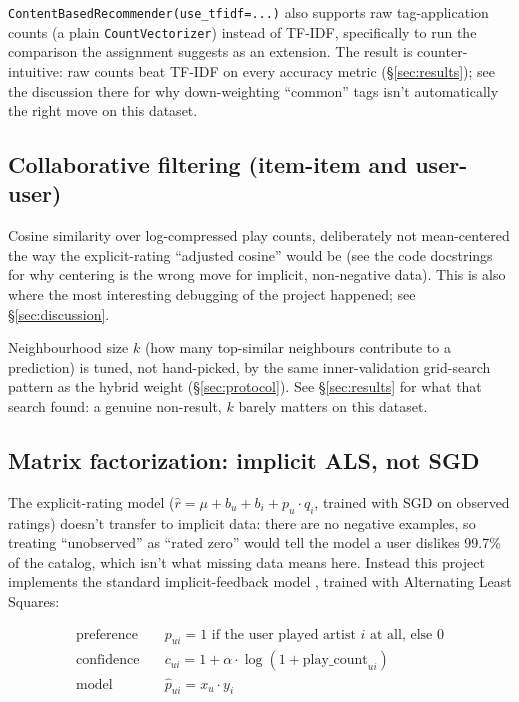 \documentclass[11pt,a4paper]{article}
\newcommand{\code}[1]{\texttt{#1}}
\newcommand{\secref}[1]{\S\ref{#1}}
\begin{document}
\code{ContentBasedRecommender(use\_tfidf=...)} also supports raw tag-application counts (a plain \code{CountVectorizer}) instead of TF-IDF, specifically to run the comparison the assignment suggests as an extension. The result is counter-intuitive: raw counts beat TF-IDF on every accuracy metric (\secref{sec:results}); see the discussion there for why down-weighting ``common'' tags isn't automatically the right move on this dataset.

\subsection{Collaborative filtering (item-item and user-user)}

Cosine similarity over log-compressed play counts, deliberately not mean-centered the way the explicit-rating ``adjusted cosine'' would be (see the code docstrings for why centering is the wrong move for implicit, non-negative data). This is also where the most interesting debugging of the project happened; see \secref{sec:discussion}.

Neighbourhood size $k$ (how many top-similar neighbours contribute to a prediction) is tuned, not hand-picked, by the same inner-validation grid-search pattern as the hybrid weight (\secref{sec:protocol}). See \secref{sec:results} for what that search found: a genuine non-result, $k$ barely matters on this dataset.

\subsection{Matrix factorization: implicit ALS, not SGD}
\label{sec:als}

The explicit-rating model ($\hat{r} = \mu + b_u + b_i + p_u \cdot q_i$, trained with SGD on observed ratings) doesn't transfer to implicit data: there are no negative examples, so treating ``unobserved'' as ``rated zero'' would tell the model a user dislikes 99.7\% of the catalog, which isn't what missing data means here. Instead this project implements the standard implicit-feedback model \citep{hu2008collaborative}, trained with Alternating Least Squares:

\begin{align}
\text{preference} \quad & p_{ui} = 1 \text{ if the user played artist } i \text{ at all, else } 0 \\
\text{confidence} \quad & c_{ui} = 1 + \alpha \cdot \log(1 + \text{play\_count}_{ui}) \\
\text{model} \quad & \hat{p}_{ui} = x_u \cdot y_i
\end{align}
\end{document}
